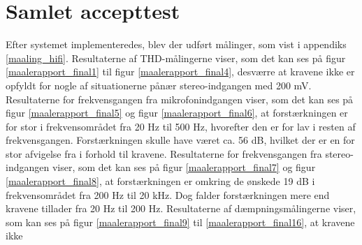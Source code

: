 \chapter{Samlet accepttest}
\label{acceptest}
Efter systemet implementeredes, blev der udført målinger, som vist i appendiks \ref{maaling_hifi}. Resultaterne af THD-målingerne viser, som det kan ses på figur \ref{maalerapport_final1} til figur \ref{maalerapport_final4}, desværre at kravene ikke er opfyldt for nogle af situationerne pånær stereo-indgangen med 200 mV. Resultaterne for frekvensgangen fra mikrofonindgangen viser, som det kan ses på figur \ref{maalerapport_final5} og figur \ref{maalerapport_final6}, at forstærkningen er for stor i frekvensområdet fra 20 Hz til 500 Hz, hvorefter den er for lav i resten af frekvensgangen. Forstærkningen skulle have været ca. 56 dB, hvilket der er en for stor afvigelse fra i forhold til kravene. Resultaterne for frekvensgangen fra stereo-indgangen viser, som det kan ses på figur \ref{maalerapport_final7} og figur \ref{maalerapport_final8}, at forstærkningen er omkring de ønskede 19 dB i frekvensområdet fra 200 Hz til 20 kHz. Dog falder forstærkningen mere end kravene tillader fra 20 Hz til 200 Hz. Resultaterne af dæmpningsmålingerne viser, som kan ses på figur \ref{maalerapport_final9} til \ref{maalerapport_final16}, at kravene ikke 

